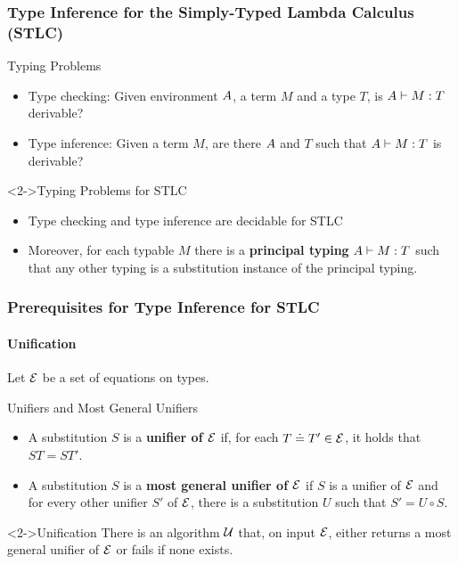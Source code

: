 \documentclass[pdftex,aspectratio=169]{beamer}
\begin{document}
\begin{frame}
  \frametitle{Type Inference for the Simply-Typed Lambda Calculus (STLC)}
  \begin{block}{Typing Problems}
    \begin{itemize}
    \item Type checking: Given environment $A$, a term $M$ and a
      type $T$, is $A \vdash M : T$ derivable?
    \item Type inference: Given a term $M$, are there $A$ and $T$ such
      that $A\vdash M : T$ is derivable?
    \end{itemize}
  \end{block}
  \begin{block}<2->{Typing Problems for STLC}
    \begin{itemize}
    \item Type checking and type inference are decidable for STLC
    \item Moreover, for each typable $M$ there is a \textbf{principal typing}
      $A\vdash M:T$ such that any other typing is a
      substitution instance of the principal typing.
    \end{itemize}
  \end{block}
\end{frame}


\begin{frame}
  \frametitle{Prerequisites for Type Inference for STLC}
  \framesubtitle{Unification}
  Let $\mathcal{E}$ be a set of equations on types.
  \begin{block}{Unifiers and Most General Unifiers}
    \begin{itemize}
    \item A substitution $S$ is a \textbf{unifier of $\mathcal{E}$} if,
      for each $T \doteq T'\in \mathcal{E}$, it holds that $ST
      = ST'$.
    \item 
      A substitution $S$ is a \textbf{most general unifier of
        $\mathcal{E}$} if $S$ is a unifier of $\mathcal{E}$ and for every
      other unifier $S'$ of $\mathcal{E}$, there is a substitution
      $U$ such that $S' = U \circ S$.
    \end{itemize}
  \end{block}
  \begin{block}<2->{Unification}
    There is an algorithm $\mathcal{U}$ that, on input $\mathcal{E}$, either returns a
    most general unifier of $\mathcal{E}$ or fails if none exists.
  \end{block}
\end{frame}
\end{document}
